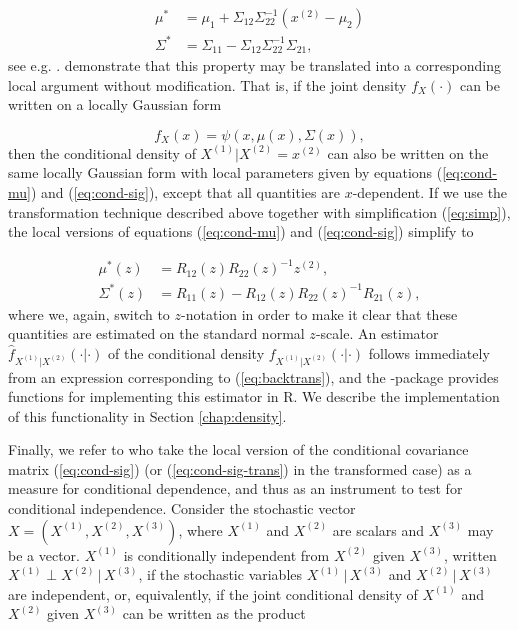 \begin{align}
\mu^* &= \mu_1 + \Sigma_{12}\Sigma_{22}^{-1}\left(x^{(2)} - \mu_2\right) \label{eq:cond-mu} \\
\Sigma^* &= \Sigma_{11} - \Sigma_{12}\Sigma_{22}^{-1}\Sigma_{21}, \label{eq:cond-sig}
\end{align}
see e.g. \citet[chapter 4]{john:wich:2007}. \citet{otne:tjos:2018} demonstrate that this property may be translated into a corresponding local argument without modification. That is, if the joint density $f_X(\cdot)$ can be written on a locally Gaussian form 

$$f_X(x) = \psi(x, \mu(x), \Sigma(x)),$$
then the conditional density of $X^{(1)}|X^{(2)} = x^{(2)}$ can also be written on the same locally Gaussian form with local parameters given by equations (\ref{eq:cond-mu}) and (\ref{eq:cond-sig}), except that all quantities are $x$-dependent. If we use the transformation technique described above together with simplification (\ref{eq:simp}), the local versions of equations (\ref{eq:cond-mu}) and (\ref{eq:cond-sig}) simplify to

\begin{align}
\mu^*(z) &= R_{12}(z)R_{22}(z)^{-1}z^{(2)},  \label{eq:cond-mu-trans}\\
\Sigma^*(z) &= R_{11}(z) - R_{12}(z)R_{22}(z)^{-1}R_{21}(z), \label{eq:cond-sig-trans}
\end{align}
where we, again, switch to $z$-notation in order to make it clear that these quantities are estimated on the standard normal $z$-scale. An estimator $\widehat f_{X^{(1)}|X^{(2)}}(\cdot|\cdot)$ of the conditional density $f_{X^{(1)}|X^{(2)}}(\cdot|\cdot)$ follows immediately from an expression corresponding to (\ref{eq:backtrans}), and the -package provides functions for implementing this estimator in R. We describe the implementation of this functionality in Section \ref{chap:density}.

Finally, we refer to \citet{otne:tjos:2019} who take the local version of the conditional covariance matrix (\ref{eq:cond-sig}) (or (\ref{eq:cond-sig-trans}) in the transformed case) as a measure for conditional dependence, and thus as an instrument to test for conditional independence. Consider the stochastic vector $X = \left(X^{(1)}, X^{(2)}, X^{(3)}\right)$, where $X^{(1)}$ and $X^{(2)}$ are scalars and $X^{(3)}$ may be a vector. $X^{(1)}$ is conditionally independent from $X^{(2)}$ given $X^{(3)}$, written $X^{(1)} \perp X^{(2)} \,|\,X^{(3)}$, if the stochastic variables $X^{(1)}\,|\,X^{(3)}$ and $X^{(2)}\,|\,X^{(3)}$ are independent, or, equivalently, if the joint conditional density of $X^{(1)}$ and $X^{(2)}$ given $X^{(3)}$ can be written as the product

